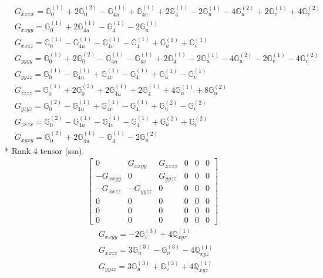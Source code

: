 \documentclass[fleqn,8pt,landscape]{jsarticle}
\begin{document}
\begin{align*}
& G_{xxxx} = \mathbb{G}_{0}^{(1)} + 2 \mathbb{G}_{0}^{(2)} - \mathbb{G}_{4u}^{(1)} + \mathbb{G}_{4v}^{(1)} + 2 \mathbb{G}_{4}^{(1)} - 2 \mathbb{G}_{u}^{(1)} - 4 \mathbb{G}_{u}^{(2)} + 2 \mathbb{G}_{v}^{(1)} + 4 \mathbb{G}_{v}^{(2)} \\
& G_{xxyy} = \mathbb{G}_{0}^{(1)} + 2 \mathbb{G}_{4u}^{(1)} - \mathbb{G}_{4}^{(1)} - 2 \mathbb{G}_{u}^{(1)} \\
& G_{xxzz} = \mathbb{G}_{0}^{(1)} - \mathbb{G}_{4u}^{(1)} - \mathbb{G}_{4v}^{(1)} - \mathbb{G}_{4}^{(1)} + \mathbb{G}_{u}^{(1)} + \mathbb{G}_{v}^{(1)} \\
& G_{yyyy} = \mathbb{G}_{0}^{(1)} + 2 \mathbb{G}_{0}^{(2)} - \mathbb{G}_{4u}^{(1)} - \mathbb{G}_{4v}^{(1)} + 2 \mathbb{G}_{4}^{(1)} - 2 \mathbb{G}_{u}^{(1)} - 4 \mathbb{G}_{u}^{(2)} - 2 \mathbb{G}_{v}^{(1)} - 4 \mathbb{G}_{v}^{(2)} \\
& G_{yyzz} = \mathbb{G}_{0}^{(1)} - \mathbb{G}_{4u}^{(1)} + \mathbb{G}_{4v}^{(1)} - \mathbb{G}_{4}^{(1)} + \mathbb{G}_{u}^{(1)} - \mathbb{G}_{v}^{(1)} \\
& G_{zzzz} = \mathbb{G}_{0}^{(1)} + 2 \mathbb{G}_{0}^{(2)} + 2 \mathbb{G}_{4u}^{(1)} + 2 \mathbb{G}_{4}^{(1)} + 4 \mathbb{G}_{u}^{(1)} + 8 \mathbb{G}_{u}^{(2)} \\
& G_{yzyz} = \mathbb{G}_{0}^{(2)} - \mathbb{G}_{4u}^{(1)} + \mathbb{G}_{4v}^{(1)} - \mathbb{G}_{4}^{(1)} + \mathbb{G}_{u}^{(2)} - \mathbb{G}_{v}^{(2)} \\
& G_{zxzx} = \mathbb{G}_{0}^{(2)} - \mathbb{G}_{4u}^{(1)} - \mathbb{G}_{4v}^{(1)} - \mathbb{G}_{4}^{(1)} + \mathbb{G}_{u}^{(2)} + \mathbb{G}_{v}^{(2)} \\
& G_{xyxy} = \mathbb{G}_{0}^{(2)} + 2 \mathbb{G}_{4u}^{(1)} - \mathbb{G}_{4}^{(1)} - 2 \mathbb{G}_{u}^{(2)}
\end{align*}
* Rank 4 tensor (ssa).
\begin{align*}
\begin{bmatrix} 0 & G_{xxyy} & G_{xxzz} & 0 & 0 & 0 \\ - G_{xxyy} & 0 & G_{yyzz} & 0 & 0 & 0 \\ - G_{xxzz} & - G_{yyzz} & 0 & 0 & 0 & 0 \\ 0 & 0 & 0 & 0 & 0 & 0 \\ 0 & 0 & 0 & 0 & 0 & 0 \\ 0 & 0 & 0 & 0 & 0 & 0 \end{bmatrix}
\end{align*}
\begin{align*}
& G_{xxyy} = - 2 \mathbb{G}_{v}^{(3)} + 4 \mathbb{Q}_{xyz}^{(1)} \\
& G_{xxzz} = 3 \mathbb{G}_{u}^{(3)} - \mathbb{G}_{v}^{(3)} - 4 \mathbb{Q}_{xyz}^{(1)} \\
& G_{yyzz} = 3 \mathbb{G}_{u}^{(3)} + \mathbb{G}_{v}^{(3)} + 4 \mathbb{Q}_{xyz}^{(1)}
\end{align*}
\end{document}
